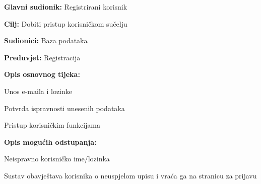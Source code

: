 					\noindent {}
					\begin{packed_item}
	
						\item \textbf{Glavni sudionik: } Registrirani korisnik
						\item  \textbf{Cilj:} Dobiti pristup korisničkom sučelju
						\item  \textbf{Sudionici:} Baza podataka
						\item  \textbf{Preduvjet:} Registracija
						\item  \textbf{Opis osnovnog tijeka:}
						
						\item[] \begin{packed_enum}
	
							\item Unos e-maila i lozinke
							\item Potvrda ispravnosti unesenih podataka
							\item Pristup korisničkim funkcijama

						\end{packed_enum}
						
						\item  \textbf{Opis mogućih odstupanja:}
						
						\item[] \begin{packed_item}
	
							\item[2.a] Neispravno korisničko ime/lozinka
							\item[] \begin{packed_enum}
								
								\item Sustav obavještava korisnika o neuspjelom upisu i vraća ga na stranicu za prijavu
								
							\end{packed_enum}

						\end{packed_item}
					\end{packed_item}
					
